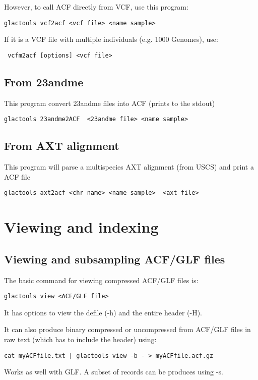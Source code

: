 \documentclass[a4paper]{article}
\begin{document}
However, to call ACF directly from VCF, use this program:

\begin{lstlisting}
glactools vcf2acf <vcf file> <name sample> 
\end{lstlisting}

If it is a VCF file with multiple individuals (e.g. 1000 Genomes), use:
\begin{lstlisting}
 vcfm2acf [options] <vcf file>
\end{lstlisting}

\subsection{From 23andme}

\noindent This program convert 23andme files into ACF (prints to the stdout)

\begin{lstlisting}
glactools 23andme2ACF  <23andme file> <name sample>
\end{lstlisting}

\subsection{From AXT alignment}

\noindent This program will parse a multispecies AXT alignment (from USCS) and print a ACF file

\begin{lstlisting}
glactools axt2acf <chr name> <name sample>  <axt file>
\end{lstlisting}

\newpage
\section{Viewing and indexing}

\subsection{Viewing and subsampling ACF/GLF files }

The basic command for viewing compressed ACF/GLF files is:

\begin{lstlisting}
glactools view <ACF/GLF file>
\end{lstlisting}

It has options to view the defile (-h) and the entire header (-H).

It can also produce binary compressed or uncompressed from ACF/GLF files in raw text (which has to include the header) using:
\begin{lstlisting}
cat myACFfile.txt | glactools view -b - > myACFfile.acf.gz
\end{lstlisting}
Works as well with GLF. A subset of records can be produces using -s.
\end{document}
